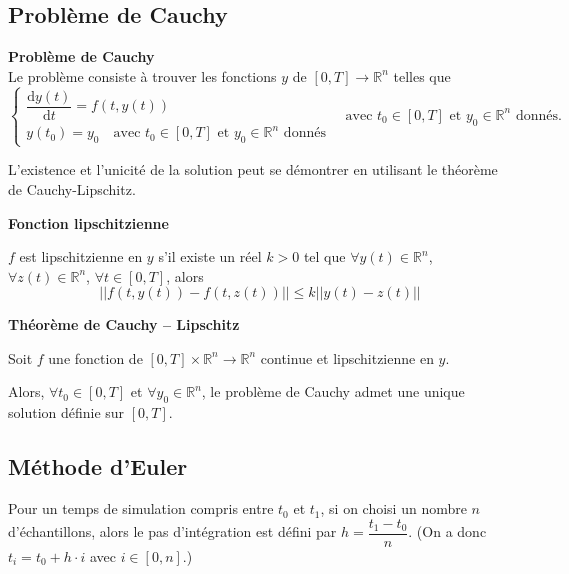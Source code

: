 \subsection{Problème de Cauchy}
\begin{rappel} \textbf{Problème de Cauchy} \\ 
Le problème consiste à trouver les fonctions $y$ de $[0,T]\rightarrow \mathbb{R}^n$ telles que
$$
\left\{
\begin{array}{l}
\dfrac{\text{d} y(t)}{\text{d} t}=f(t,y(t)) \\
y(t_0)=y_0 \quad \text{avec } t_0\in [0,T] \text{ et } y_0\in \mathbb{R}^n \text{ donnés}
\end{array}
\quad \text{avec } t_0\in [0,T] \text{ et } y_0\in \mathbb{R}^n \text{ donnés.}
\right.
 $$ 
\end{rappel}
L'existence et l'unicité de la solution peut se démontrer en utilisant le théorème de Cauchy-Lipschitz.


\begin{defi}
\textbf{Fonction lipschitzienne}

$f$ est lipschitzienne en $y$ s'il existe un réel $k>0$ tel que $\forall y(t)\in\mathbb{R}^n$, $\forall z(t)\in\mathbb{R}^n$, $\forall t\in[0,T]$, alors 
$$
||f(t,y(t))-f(t,z(t))||\leq k||y(t)-z(t)||
$$

\end{defi}

\begin{theorem}
\textbf{Théorème de Cauchy -- Lipschitz}

Soit $f$ une fonction de $[0,T] \times \mathbb{R}^n \rightarrow \mathbb{R}^n$ continue et lipschitzienne en $y$. 

Alors, $\forall t_0 \in [0,T]$ et $\forall y_0 \in \mathbb{R}^n$, le problème de Cauchy admet une unique solution définie sur $[0,T]$.

\end{theorem}

\subsection{Méthode d'Euler}
Pour un temps de simulation compris entre $t_0$ et $t_1$, si on choisi un nombre $n$ d'échantillons, alors le pas d'intégration est défini par  $h=\dfrac{t_1-t_0}{n}$. (On a donc $t_i = t_0+h\cdot i$ avec $i\in[0,n]$.)

